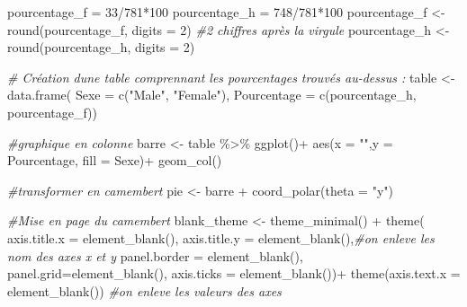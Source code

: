 \documentclass[
]{article}
\newenvironment{Shaded}{\begin{snugshade}}{\end{snugshade}}
\newcommand{\AttributeTok}[1]{\textcolor[rgb]{0.77,0.63,0.00}{#1}}
\newcommand{\CommentTok}[1]{\textcolor[rgb]{0.56,0.35,0.01}{\textit{#1}}}
\newcommand{\DecValTok}[1]{\textcolor[rgb]{0.00,0.00,0.81}{#1}}
\newcommand{\FunctionTok}[1]{\textcolor[rgb]{0.00,0.00,0.00}{#1}}
\newcommand{\NormalTok}[1]{#1}
\newcommand{\OtherTok}[1]{\textcolor[rgb]{0.56,0.35,0.01}{#1}}
\newcommand{\SpecialCharTok}[1]{\textcolor[rgb]{0.00,0.00,0.00}{#1}}
\newcommand{\StringTok}[1]{\textcolor[rgb]{0.31,0.60,0.02}{#1}}
\begin{document}
\begin{Shaded}
\begin{Highlighting}[]
\NormalTok{pourcentage\_f }\OtherTok{=} \DecValTok{33}\SpecialCharTok{/}\DecValTok{781}\SpecialCharTok{*}\DecValTok{100}
\NormalTok{pourcentage\_h }\OtherTok{=} \DecValTok{748}\SpecialCharTok{/}\DecValTok{781}\SpecialCharTok{*}\DecValTok{100}
\NormalTok{pourcentage\_f }\OtherTok{\textless{}{-}} \FunctionTok{round}\NormalTok{(pourcentage\_f, }\AttributeTok{digits =} \DecValTok{2}\NormalTok{) }\CommentTok{\#2 chiffres après la virgule}
\NormalTok{pourcentage\_h }\OtherTok{\textless{}{-}} \FunctionTok{round}\NormalTok{(pourcentage\_h, }\AttributeTok{digits =} \DecValTok{2}\NormalTok{)}

\CommentTok{\# Création d\textquotesingle{}une table comprennant les pourcentages trouvés au{-}dessus : }
\NormalTok{table }\OtherTok{\textless{}{-}} \FunctionTok{data.frame}\NormalTok{( }\AttributeTok{Sexe =} \FunctionTok{c}\NormalTok{(}\StringTok{"Male"}\NormalTok{, }\StringTok{"Female"}\NormalTok{),}
                     \AttributeTok{Pourcentage =} \FunctionTok{c}\NormalTok{(pourcentage\_h, pourcentage\_f))}

\CommentTok{\#graphique en colonne}
\NormalTok{barre }\OtherTok{\textless{}{-}}\NormalTok{ table }\SpecialCharTok{\%\textgreater{}\%} 
  \FunctionTok{ggplot}\NormalTok{()}\SpecialCharTok{+}
  \FunctionTok{aes}\NormalTok{(}\AttributeTok{x =} \StringTok{""}\NormalTok{,}\AttributeTok{y =}\NormalTok{ Pourcentage, }\AttributeTok{fill =}\NormalTok{ Sexe)}\SpecialCharTok{+}
  \FunctionTok{geom\_col}\NormalTok{()}

\CommentTok{\#transformer en camembert}
\NormalTok{pie }\OtherTok{\textless{}{-}}\NormalTok{ barre }\SpecialCharTok{+}
        \FunctionTok{coord\_polar}\NormalTok{(}\AttributeTok{theta =} \StringTok{"y"}\NormalTok{)}

\CommentTok{\#Mise en page du camembert}
\NormalTok{blank\_theme }\OtherTok{\textless{}{-}} \FunctionTok{theme\_minimal}\NormalTok{() }\SpecialCharTok{+} 
  \FunctionTok{theme}\NormalTok{(}
    \AttributeTok{axis.title.x =} \FunctionTok{element\_blank}\NormalTok{(),}
    \AttributeTok{axis.title.y =} \FunctionTok{element\_blank}\NormalTok{(),}\CommentTok{\#on enleve les nom des axes x et y}
    \AttributeTok{panel.border =} \FunctionTok{element\_blank}\NormalTok{(),}
    \AttributeTok{panel.grid=}\FunctionTok{element\_blank}\NormalTok{(),}
    \AttributeTok{axis.ticks =} \FunctionTok{element\_blank}\NormalTok{())}\SpecialCharTok{+} 
    \FunctionTok{theme}\NormalTok{(}\AttributeTok{axis.text.x =} \FunctionTok{element\_blank}\NormalTok{()) }\CommentTok{\#on enleve les valeurs des axes}


\end{Highlighting}
\end{Shaded}
\end{document}
